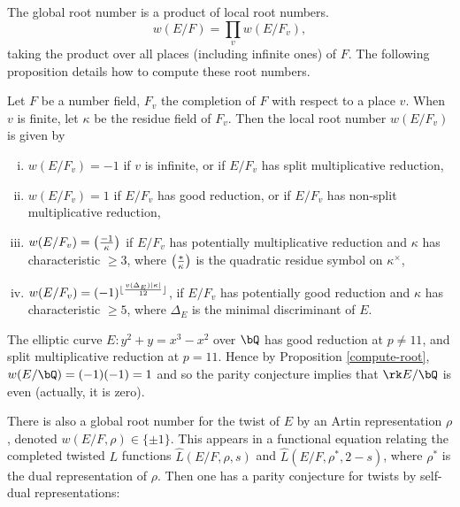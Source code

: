 The global root number is a product of local root numbers. 
\[ w(E / F) = \prod_v w(E / F_v), \]
taking the product over all places (including infinite ones) of $F$. 
The following proposition details how to compute these root numbers. 

\begin{prop}\cite[Theorem 3.1]{DD-BSD}\label{compute-root}
    Let $F$ be a number field, $F_v$ the completion of $F$ with respect to a place $v$. When $v$ is finite, 
    let $\kappa$ be the residue field of $F_v$. Then the local root number $w(E / F_v)$ is given by 
    \begin{enumerate}[(i)]
        \setlength\itemsep{0em}
        \item $w(E / F_v) = -1$ if $v$ is infinite, or if  $E / F_v$ has split multiplicative reduction,
        \item $w(E / F_v) = 1$ if $E / F_v$ has good reduction, or if $E / F_v$ has non-split multiplicative reduction, 
        \item $w(E / F_v) = \left( \frac{-1}{\kappa} \right) $ if $E / F_v$ has potentially multiplicative reduction and $\kappa$ has characteristic $\geq 3$, where $\left( \frac{*}{\kappa} \right) $ is the quadratic residue symbol on ${\kappa}^{\times}$,
        \item $w(E / F_v) = (-1)^{\lfloor\frac{v(\Delta_E)|\kappa|}{12}\rfloor}$, if $E / F_v$ has potentially good reduction and $\kappa$ has characteristic $\geq 5$, where $\Delta_E$ is the minimal discriminant of $E$.  
    \end{enumerate} 
\end{prop}

\begin{example}
    The elliptic curve $E \colon y^2 + y = x^3  - x^2$ over $\bQ$ has good reduction at $p \not= 11$, and split multiplicative reduction at $p = 11$. Hence by Proposition \ref{compute-root}, $w(E / \bQ) = (-1)(-1) = 1$ and so the parity conjecture implies that $\rk E / \bQ$ is even (actually, it is zero). 
\end{example}

There is also a global root number for the twist of $E$ by an Artin representation $\rho$, denoted $w(E / F, \rho) \in \{ \pm 1 \}$. This appears in a functional equation relating the completed twisted $L$ functions $\hat{L}(E / F, \rho, s)$ and $\hat{L}(E / F, \rho^*, 2 - s)$, where $\rho^*$ is the dual representation of $\rho$. Then one has a parity conjecture for twists by self-dual representations:

